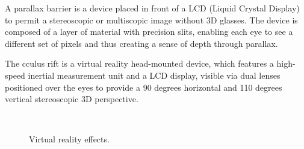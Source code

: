 A parallax barrier is a device placed in front of a LCD (Liquid Crystal Display) to permit a stereoscopic or multiscopic image without 3D glasses. The device is composed of a layer of material with precision slits, enabling each eye to see a different set of pixels and thus creating a sense of depth through parallax.

The cculus rift is a virtual reality head-mounted device, which features a high-speed inertial measurement unit and a LCD display, visible via dual lenses positioned over the eyes to provide a 90 degrees horizontal and 110 degrees vertical stereoscopic 3D perspective.

\begin{figure}
\centering
{}
\\
\caption{Virtual reality effects.}
\label{iview:effect}
\end{figure}

